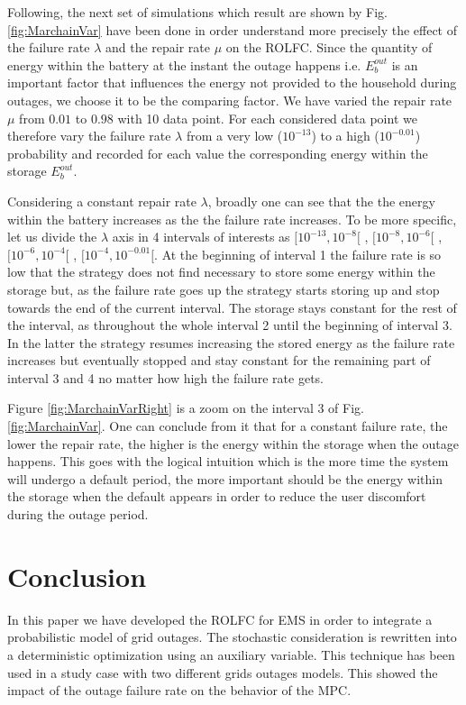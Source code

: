 \documentclass[conference]{IEEEtran}
\begin{document}
  Following, the next set of simulations which result are shown by Fig. \ref{fig:MarchainVar} have been done in order understand more precisely the effect of the failure rate $\lambda$ and the repair rate $\mu$ on the ROLFC. Since the quantity of energy within the battery at the instant the outage happens i.e. $E_b^{out}$ is an important factor that influences the energy not provided to the household during outages, we choose it to be the comparing factor. We have varied the repair rate $\mu$ from $0.01$ to $0.98$ with 10 data point. For each considered data point we therefore vary the failure rate $\lambda$ from a very low ($10^{-13}$) to a high ($10^{-0.01}$) probability  and recorded for each value the corresponding energy within the storage $E_b^{out}$. 
  
  Considering a constant repair rate $\lambda$, broadly one can see that the the energy within the battery increases as the the failure rate increases. To be more specific, let us divide the $\lambda$ axis in 4 intervals of interests as $[10^{-13}, 10^{-8}[$ , $[10^{-8}, 10^{-6}[$ , $[10^{-6}, 10^{-4}[$ , $[10^{-4}, 10^{-0.01}[$. At the beginning of interval 1 the failure rate is so low that the strategy does not find necessary to store some energy within the storage but, as the failure rate goes up the strategy starts storing up and stop towards the end of the current interval. The storage stays constant for the rest of the interval, as throughout the whole interval 2 until the beginning of interval 3. In the latter the strategy resumes increasing the stored energy as the failure rate increases but eventually stopped and stay constant for the remaining part of interval 3 and 4 no matter how high the failure rate gets. 
  
  Figure \ref{fig:MarchainVarRight} is a zoom on the interval 3 of Fig. \ref{fig:MarchainVar}. One can conclude from it that for a constant failure rate, the lower the repair rate, the higher is the energy within the storage when the outage happens. This goes with the logical intuition which is the more time the system will undergo a default period, the more important should be the energy within the storage when the default appears in order to reduce the user discomfort during the outage period. 
 
\section{Conclusion}\label{conclusion}
In this paper we have developed the ROLFC for EMS in order to integrate a probabilistic model of grid outages. The stochastic consideration is rewritten into a deterministic optimization using an auxiliary variable. This technique has been used in a study case with two different grids outages models. This showed the impact of the outage  failure rate on the behavior of the MPC.
\end{document}
